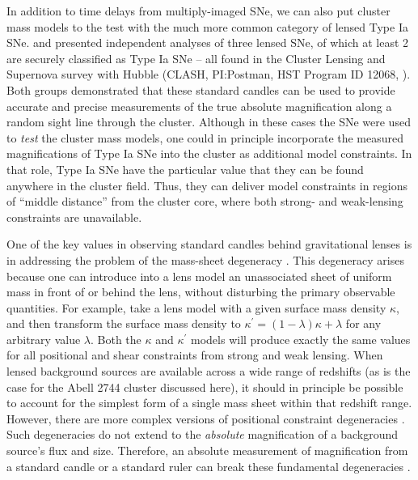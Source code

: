 In addition to time delays from multiply-imaged SNe, we can also
put cluster mass models to the test with the much more common category
of lensed Type Ia SNe.  
\citet[][hereafter P14]{Patel:2014} and \citet{Nordin:2014} presented
independent analyses of three lensed SNe, of which at least 2 are
securely classified as Type Ia SNe -- all found in the Cluster Lensing
and Supernova survey with Hubble (CLASH, PI:Postman, HST Program ID
12068, \citealt{Postman:2012}).  Both groups demonstrated that these
standard candles can be used to provide accurate and precise
measurements of the true absolute magnification along a random sight
line through the cluster.  Although in these cases the SNe were used
to {\it test} the cluster mass models, one could in principle
incorporate the measured magnifications of Type Ia SNe into the
cluster as additional model constraints.  In that role, Type Ia SNe
have the particular value that they can be found anywhere in the
cluster field.  Thus, they can deliver model constraints in regions of
``middle distance'' from the cluster core, where both strong- and
weak-lensing constraints are unavailable.


One of the key values in observing standard candles behind
gravitational lenses is in addressing the problem of the
mass-sheet degeneracy \citep{Falco:1985,Bradac:2004}.  This
degeneracy arises because one can introduce into a lens model an
unassociated sheet of uniform mass in front of or behind the
lens, without disturbing the primary observable quantities.  For
example, take a lens model with a given surface mass density $\kappa$,
and then transform the surface mass density to
$\kappa^{\prime}=(1-\lambda)\kappa+\lambda$ for any arbitrary value
$\lambda$.  Both the $\kappa$ and $\kappa^{\prime}$ models will
produce exactly the same values for all positional and shear
constraints from strong and weak lensing.  When lensed background
sources are available across a wide range of redshifts (as is the case
for the Abell 2744 cluster discussed here), it should in principle be
possible to account for the simplest form of a single mass sheet
within that redshift range.  However, there are more complex versions
of positional constraint
degeneracies \citep{Schneider:2014,Liesenborgs:2012}.  Such
degeneracies do not extend to the {\it absolute} magnification of a
background source's flux and size.  Therefore, an absolute measurement
of magnification from a standard candle or a standard ruler
\citep{Sonnenfeld:2011}  can break these fundamental degeneracies
\citep{Holz:2001}.

